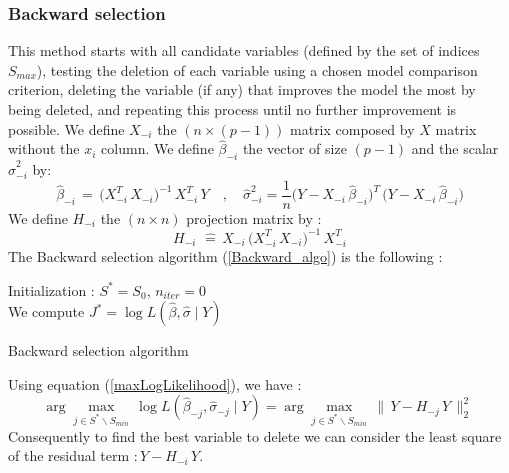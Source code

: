 \newpage
\subsubsection{Backward selection}
This method starts with all candidate variables
(defined by the set of indices $S_{max}$), testing the deletion of each variable using a chosen model comparison criterion,
 deleting the variable (if any) that improves the model the most by being deleted, and repeating this process until no further improvement is possible.
We define $X_{-i}$ the $(n \times (p-1))$ matrix composed by $X$ matrix without the $x_i$ column.
We define $\hat{\beta}_{-i}$ the vector of size $(p-1)$ and the scalar $\hat{\sigma}_{-i}^2$ by:
 \begin{equation}
  \hat{\beta}_{-i} \,=\, \big(X^T_{-i} \,X_{-i}\big)^{-1} \,X^T_{-i} \, Y
\quad,\quad
\hat{\sigma}_{-i}^2 = \frac{1}{n}\big(Y-X_{-i} \,\hat{\beta}_{-i}\big)^T\,\big(Y-X_{-i} \,\hat{\beta}_{-i}\big)
\end{equation}
We define $H_{-i}$ the $(n\times n)$ projection matrix by :
 \begin{equation}
\label{H-}
H_{-i}\, \,\hat{=}\, X_{-i}\,\big(X^T_{-i} \,X_{-i}\big)^{-1} \,X^T_{-i}
 \end{equation}
The Backward selection algorithm (\ref{Backward_algo}) is the following :
\begin{algorithm}
\label{Backward_algo}
Initialization : $S^* = S_0$, $n_{iter} = 0 $\\
We compute $J^* = \log L(\hat{\beta},\hat{\sigma}\mid Y)$  \\
\caption{Backward selection algorithm }
\end{algorithm}

Using equation (\ref{maxLogLikelihood}), we have :
 \begin{equation}
 \arg   \displaystyle\max_{j \in S^*\backslash S_{min}}\,  \log L(\hat{\beta}_{-j},\hat{\sigma}_{-j}\mid Y) =
\arg \displaystyle\max_{j \in S^*\backslash S_{min}}\, \|\,Y-H_{-j}\,Y\,\|^2_2  \,\,
 \end{equation}
 Consequently to find the best variable to delete we can consider the least square of the residual term $:Y-H_{-i}\,Y$.

